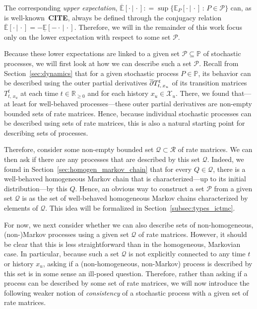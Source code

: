 \documentclass[10pt,a4paper]{paper}
\theoremstyle{definition}
\newcommand{\reals}{\mathbb{R}}
\newcommand{\realsnonneg}{\reals_{\geq 0}}
\newcommand{\states}{\mathcal{X}}
\newcommand{\processes}{\mathbb{P}}
\newcommand{\rateset}{\mathcal{Q}}
\newcommand{\coloneqq}{:\!=}
\begin{document}
\noindent The corresponding \emph{upper expectation}, $\overline{\mathbb{E}}[\cdot\,\vert\,\cdot]\coloneqq \sup\{\mathbb{E}_P[\cdot\,\vert\,\cdot]\,:\,P\in\mathcal{P}\}$ can, as is well-known~{\bf CITE}, always be defined through the conjugacy relation $\overline{\mathbb{E}}[\cdot\,\vert\,\cdot]=-\underline{\mathbb{E}}[-\cdot\,\vert\,\cdot]$. Therefore, we will in the remainder of this work focus only on the lower expectation with respect to some set $\mathcal{P}$.

Because these lower expectations are linked to a given set $\mathcal{P}\subseteq\processes$ of stochastic processes, we will first look at how we can describe such a set $\mathcal{P}$.
Recall from Section~\ref{sec:dynamics} that for a given stochastic process $P\in\processes$, its behavior can be described using the outer partial derivatives $\smash{\overline{\partial}}T_{t,\,x_u}^t$ of its transition matrices $T_{t,\,x_u}^t$ at each time $t\in\realsnonneg$ and for each history $x_u\in\states_u$. There, we found that---at least for well-behaved processes---these outer partial derivatives are non-empty bounded sets of rate matrices. Hence, because individual stochastic processes can be described using sets of rate matrices, this is also a natural starting point for describing sets of processes.

Therefore, consider some non-empty bounded set $\rateset\subset\mathcal{R}$ of rate matrices. We can then ask if there are any processes that are described by this set $\rateset$. Indeed, we found in Section~\ref{sec:homogen_markov_chain} that for every $Q\in\rateset$, there is a well-behaved homogeneous Markov chain that is characterized---up to its initial distribution---by this $Q$. Hence, an obvious way to construct a set $\mathcal{P}$ from a given set $\rateset$ is as the set of well-behaved homogeneous Markov chains characterized by elements of $\rateset$. This idea will be formalized in Section~\ref{subsec:types_ictmc}.

For now, we next consider whether we can also describe sets of non-homogeneous, (non-)Markov processes using a given set $\rateset$ of rate matrices. However, it should be clear that this is less straightforward than in the homogeneous, Markovian case. In particular, because such a set $\rateset$ is not explicitly connected to any time $t$ or history $x_u$, asking if a (non-homogeneous, non-Markov) process is described by this set is in some sense an ill-posed question.
Therefore, rather than asking if a process can be described by some set of rate matrices, we will now introduce the following weaker notion of \emph{consistency} of a stochastic process with a given set of rate matrices.
\end{document}
